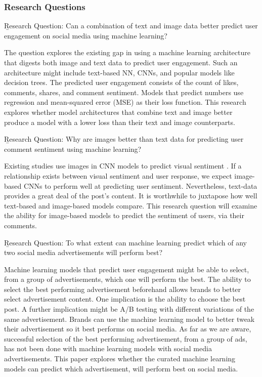 \documentclass[mksc,blindrev]{informs3} %
\begin{document}
\subsubsection{Research Questions}
\b{Research Question:} Can a combination of text and image data better predict user engagement on social media using machine learning?


The question explores the existing gap in using a machine learning architecture that digests both image and text data to predict user engagement. Such an architecture might include text-based NN, CNNs, and popular models like decision trees. The predicted user engagement consists of the count of likes, comments, shares, and comment sentiment. Models that predict numbers use regression and mean-squared error (MSE) as their loss function. This research explores whether model architectures that combine text and image better produce a model with a lower loss than their text and image counterparts. 

\b{Research Question:} Why are images better than text data for predicting user comment sentiment using machine learning?


Existing studies use images in CNN models to predict visual sentiment \cite{Segalin2017, Xu2014}. If a relationship exists between visual sentiment and user response, we expect image-based CNNs to perform well at predicting user sentiment. Nevertheless, text-data provides a great deal of the post's content. It is worthwhile to juxtapose how well text-based and image-based models compare. This research question will examine the ability for image-based models to predict the sentiment of users, via their comments.

\b{Research Question:} To what extent can machine learning predict which of any two social media advertisements will perform best?


Machine learning models that predict user engagement might be able to select, from a group of advertisements, which one will perform the best. The ability to select the best performing advertisement beforehand allows brands to better select advertisement content. One implication is the ability to choose the best post. A further implication might be A/B testing with different variations of the same advertisement. Brands can use the machine learning model to better tweak their advertisement so it best performs on social media. As far as we are aware, successful selection of the best performing advertisement, from a group of ads, has not been done with machine learning models with social media advertisements. This paper explores whether the curated machine learning models can predict which advertisement, will perform best on social media.
\end{document}

